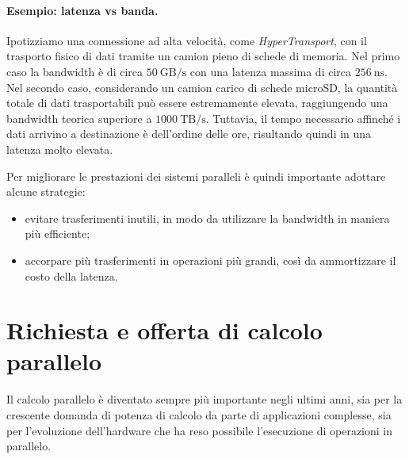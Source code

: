 \paragraph{Esempio: latenza vs banda.}
Ipotizziamo una connessione ad alta velocità, come \emph{HyperTransport}, con il trasporto fisico di dati tramite un camion pieno di schede di memoria. 
Nel primo caso la bandwidth è di circa $50\ \text{GB/s}$ con una latenza massima di circa $256\ \text{ns}$. 
Nel secondo caso, considerando un camion carico di schede microSD, la quantità totale di dati trasportabili può essere estremamente elevata, raggiungendo una bandwidth teorica superiore a $1000\ \text{TB/s}$. 
Tuttavia, il tempo necessario affinché i dati arrivino a destinazione è dell'ordine delle ore, risultando quindi in una latenza molto elevata.

Per migliorare le prestazioni dei sistemi paralleli è quindi importante adottare alcune strategie:

\begin{itemize}
\item evitare trasferimenti inutili, in modo da utilizzare la bandwidth in maniera più efficiente;
\item accorpare più trasferimenti in operazioni più grandi, così da ammortizzare il costo della latenza.
\end{itemize}

\section{Richiesta e offerta di calcolo parallelo}
Il calcolo parallelo è diventato sempre più importante negli ultimi anni, sia per la crescente domanda di potenza di calcolo da parte di applicazioni complesse, sia per l'evoluzione dell'hardware che ha reso possibile l'esecuzione di operazioni in parallelo. 

